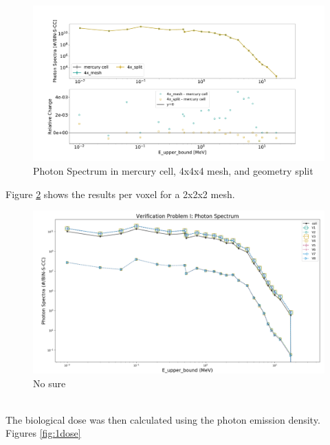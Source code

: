 \begin{figure}[h!]
 \centering
 \includegraphics[scale=0.42,trim={2cm 0.5cm 3cm 2cm},clip]{../figs/toy_p1/spec_VPI_4x.pdf}
 \caption{Photon Spectrum in mercury cell, 4x4x4 mesh, and geometry split}
 \label{fig:1spec_cell_4x}
\end{figure}
Figure \ref{fig:1spec_8v} shows the results per voxel for a 2x2x2 mesh.
\begin{figure}
	\centering
	\includegraphics[scale=0.4, trim={1cm 0cm 0.5cm 1.25cm},clip]{../figs/toy_p1/spec_VPI_8.png}
	\caption{No sure}
	\label{fig:1spec_8v}
\end{figure}
\\
The biological dose was then calculated using the photon emission density.
Figures \ref{fig:1dose}
%
